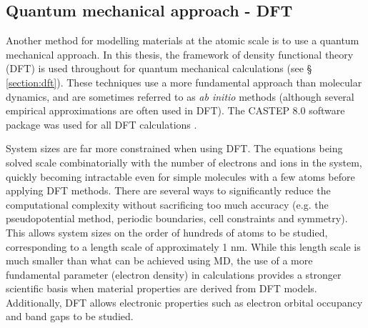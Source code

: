 

\subsection{Quantum mechanical approach - DFT}

Another method for modelling materials at the atomic scale is to use a quantum mechanical approach. In this thesis, the framework of density functional theory (DFT) is used throughout for quantum mechanical calculations (see § \ref{section:dft}). These techniques use a more fundamental approach than molecular dynamics, and are sometimes referred to as \emph{ab initio} methods (although several empirical approximations are often used in DFT). The CASTEP 8.0 software package was used for all DFT calculations \cite{Clark2005}.

System sizes are far more constrained when using DFT. The equations being solved scale combinatorially with the number of electrons and ions in the system, quickly becoming intractable even for simple molecules with a few atoms before applying DFT methods. There are several ways to significantly reduce the computational complexity without sacrificing too much accuracy (e.g. the pseudopotential method, periodic boundaries, cell constraints and symmetry). This allows system sizes on the order of hundreds of atoms to be studied, corresponding to a length scale of approximately 1 nm. While this length scale is much smaller than what can be achieved using MD, the use of a more fundamental parameter (electron density) in calculations provides a stronger scientific basis when material properties are derived from DFT models. Additionally, DFT allows electronic properties such as electron orbital occupancy and band gaps to be studied.

